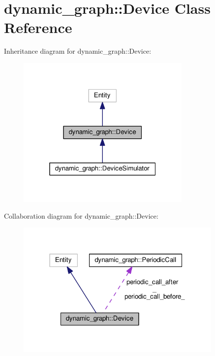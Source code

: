 \hypertarget{classdynamic__graph_1_1Device}{}\section{dynamic\+\_\+graph\+:\+:Device Class Reference}
\label{classdynamic__graph_1_1Device}


Inheritance diagram for dynamic\+\_\+graph\+:\+:Device\+:\nopagebreak
\begin{figure}[H]
\begin{center}
\leavevmode
\includegraphics[width=241pt]{classdynamic__graph_1_1Device__inherit__graph}
\end{center}
\end{figure}


Collaboration diagram for dynamic\+\_\+graph\+:\+:Device\+:\nopagebreak
\begin{figure}[H]
\begin{center}
\leavevmode
\includegraphics[width=286pt]{classdynamic__graph_1_1Device__coll__graph}
\end{center}
\end{figure}
